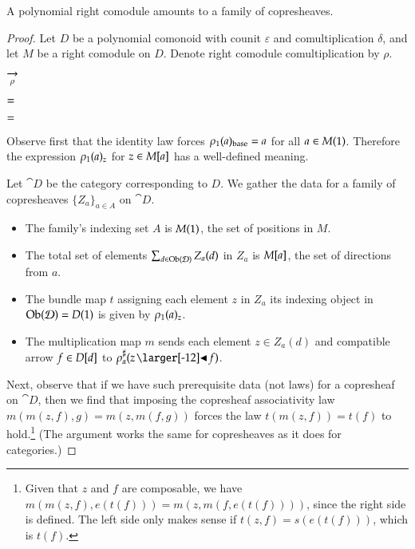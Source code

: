 \documentclass{amsart}
\begin{document}
\begin{prop}
  A polynomial right comodule amounts to a family of copresheaves.
\end{prop}
\begin{proof}
  Let $D$ be a polynomial comonoid with counit $\varepsilon$ and
  comultiplication $\delta$, and let $M$ be a right comodule on
  $D$. Denote right comodule comultiplication by $\rho$.

  \begin{center}
    
    \hspace{-.75em}
    $\underset{\rho}{\to}$
    \hspace{.5em}
    
  \end{center}

  \begin{center}
    
    $=$
    \quad
    
  \end{center}

  \begin{center}
    
    \quad
    $=$
    \quad
    
  \end{center}

  Observe first that the identity law forces ${\rho}_1(a)_{\mathrm{base}} = a$
  for all $a \in M(1)$.
  Therefore the expression ${\rho}_1(a)_z$ for $z \in M[a]$ has a
  well-defined meaning.

  Let $\cat{D}$ be the category corresponding to $D$. We gather the
  data for a family of copresheaves $\{Z_a\}_{a \in A}$ on $\cat{D}$.
  \begin{itemize}
  \item The family's indexing set $A$ is $M(1)$, the set
    of positions in $M$.
  \item The total set of elements $\sum_{d \in \operatorname{Ob}(\mathcal{D})}Z_a(d)$ in
    $Z_a$ is $M[a]$, the set of directions from $a$.
  \item The bundle map $t$ assigning each element $z$ in $Z_a$ its indexing
    object in $\operatorname{Ob}(\mathcal{D}) = D(1)$ is given by ${\rho}_1(a)_z$.
  \item The multiplication map $m$ sends each element $z \in Z_a(d)$ and compatible
    arrow $f \in D[d]$ to $\dirmapof{\rho}{a}{z \subd f}$.
  \end{itemize}
  
  Next, observe that if we have such prerequisite data (not laws) for
  a copresheaf on $\cat{D}$, then we find that imposing the copresheaf
  associativity law $m(m(z, f), g) = m(z, m(f, g))$ forces the law
  $t(m(z,f)) = t(f)$ to hold.\footnote{Given that $z$ and $f$ are
    composable, we have $m(m(z,f),e(t(f))) = m(z,m(f,e(t(f))))$, since
    the right side is defined. The left side only makes sense if
    $t(z,f) = s(e(t(f)))$, which is $t(f)$.} (The argument works the same
  for copresheaves as it does for categories.)


\end{proof}
\end{document}
